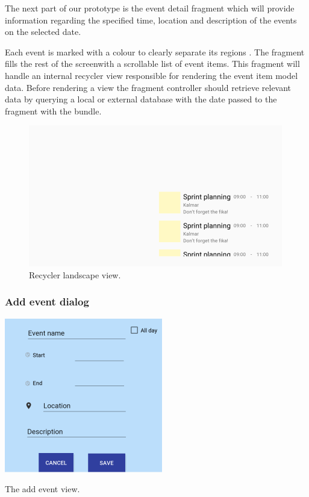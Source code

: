 \documentclass[]{article}
\begin{document}
\begin{flushleft}
The next part of our prototype is the event detail fragment which will provide information regarding the specified time, location and description of the events on the selected date.\medskip

Each event is marked with a colour to clearly separate its regions \parencite{text}.
\newline The fragment fills the rest of the screen\newline with a scrollable list of event items. This fragment will handle an internal recycler view responsible for rendering the event item model data. Before rendering a view the fragment controller should retrieve relevant data by querying a local or external database with the date passed to the fragment with the bundle.\medskip

\begin{figure}[H]
	\includegraphics[scale=0.7]{img/recycler_landscape.png}
	\caption{Recycler landscape view.}
	\label{fig:design_landscape}
\end{figure}

\newpage

\left\subsubsection{Add event dialog}

\begin{floatingfigure}[r]{0.4\linewidth}
	\includegraphics[scale=0.7]{img/dialog.png}
	\caption{The add event view.}
	\label{fig:dialog}
	\vspace{\dimexpr0.3\baselineskip-\topskip}
\end{floatingfigure}


\end{flushleft}
\end{document}

